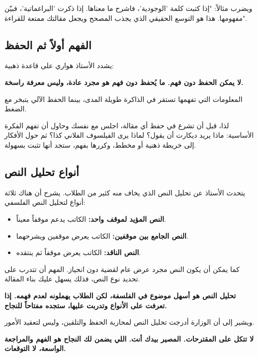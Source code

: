\documentclass[12pt,a4paper]{book}
\newcommand{\importantAr}[1]{%
	\begin{important}
		\bfseries #1
	\end{important}
}
\begin{document}
ويضرب مثالاً: "إذا كتبت كلمة 'الوجودية'، فاشرح ما معناها. إذا ذكرت 'البراغماتية'، فبيّن مفهومها. هذا هو التوسع الحقيقي الذي يجذب المصحح ويجعل مقالتك ممتعة للقراءة".

\subsection{الفهم أولاً ثم الحفظ}

يشدد الأستاذ هواري على قاعدة ذهبية: 

\importantAr{لا يمكن الحفظ دون فهم. ما يُحفظ دون فهم هو مجرد عادة، وليس معرفة راسخة.} 

المعلومات التي تفهمها تستقر في الذاكرة طويلة المدى، بينما الحفظ الآلي يتبخر مع الضغط.

لذا، قبل أن تشرع في حفظ أي مقالة، اجلس مع نفسك وحاول أن تفهم الفكرة الأساسية: ماذا يريد ديكارت أن يقول؟ لماذا يرى الفيلسوف الفلاني كذا؟ ثم حول الأفكار إلى خريطة ذهنية أو مخطط، وكررها بفهم، ستجد أنها تثبت بسهولة.

\subsection{أنواع تحليل النص}

يتحدث الأستاذ عن تحليل النص الذي يخاف منه كثير من الطلاب. يشرح أن هناك ثلاثة أنواع لتحليل النص الفلسفي:

\begin{itemize}
	\item \textbf{النص المؤيد لموقف واحد:} الكاتب يدعم موقفاً معيناً.
	\item \textbf{النص الجامع بين موقفين:} الكاتب يعرض موقفين ويشرحهما.
	\item \textbf{النص الناقد:} الكاتب يعرض موقفاً ثم ينتقده.
\end{itemize}

كما يمكن أن يكون النص مجرد عرض عام لقضية دون انحياز. المهم أن تتدرب على تحديد نوع النص، فذلك يسهل عليك بناء المقالة.

\importantAr{تحليل النص هو أسهل موضوع في الفلسفة، لكن الطلاب يهملونه لعدم فهمه. إذا تعرفت على الأنواع وتدربت عليها، ستجده مفتاحاً للنجاح.}

ويشير إلى أن الوزارة أدرجت تحليل النص لمحاربة الحفظ والتلقين، وليس لتعقيد الأمور.


\importantAr{لا تتكل على المقترحات. المصير بيدك أنت. اللي يضمن لك النجاح هو الفهم والمراجعة الواسعة، لا التوقعات.}
\end{document}
